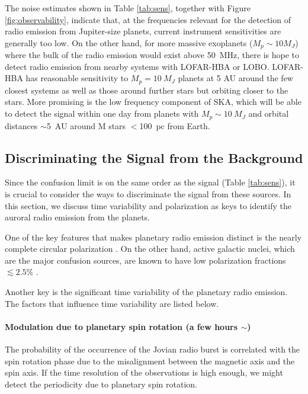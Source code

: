 \documentclass[iop,numberedappendix,apj]{emulateapj}
\begin{document}
The noise estimates shown in Table \ref{tab:sens}, together with Figure \ref{fig:observability}, indicate that, at the frequencies relevant for the detection of radio emission from Jupiter-size planets, current instrument sensitivities are generally too low.
On the other hand, for more massive exoplanets ($M_p\sim 10 M_J$) where the bulk of the radio emission would exist above 50~MHz, there is hope to detect radio emission from nearby systems with LOFAR-HBA or LOBO.
LOFAR-HBA has reasonable sensitivity to $M_p =10~M_J$ planets at 5 AU around the few closest systems as well as those around further stars but orbiting closer to the stars. 
More promising is the low frequency component of SKA, which will be able to detect the signal within one day from planets with $M_p \sim 10~M_J$ and orbital distances $\sim$5~AU around M stars $<$100~pc from Earth.




\subsection{Discriminating the Signal from the Background}
\label{ss:timevariability}


Since the confusion limit is on the same order as the signal (Table \ref{tab:sens}), it is crucial to consider the ways to discriminate the signal from these sources. In this section, we discuss time variability and polarization as keys to identify the auroral radio emission from the planets. 

One of the key features that makes planetary radio emission distinct is the nearly  complete circular polarization \citep[e.g.][and reference therein]{dessler1983}. 
On the other hand, active galactic nuclei, which are the major confusion sources, are known to have low polarization fractions $\lesssim2.5\%$ \citep{Stil2014}. 

Another key is the significant time variability of the planetary radio emission. 
The factors that influence time variability are listed below. 

\paragraph{Modulation due to planetary spin rotation (a few hours $\sim $)}
The probability of the occurrence of the Jovian radio burst is correlated with the spin rotation phase \citep{dessler1983} due to the misalignment between the magnetic axis and the spin axis. If the time resolution of the observations is high enough, we might detect the periodicity due to planetary spin rotation. 
%
\end{document}
